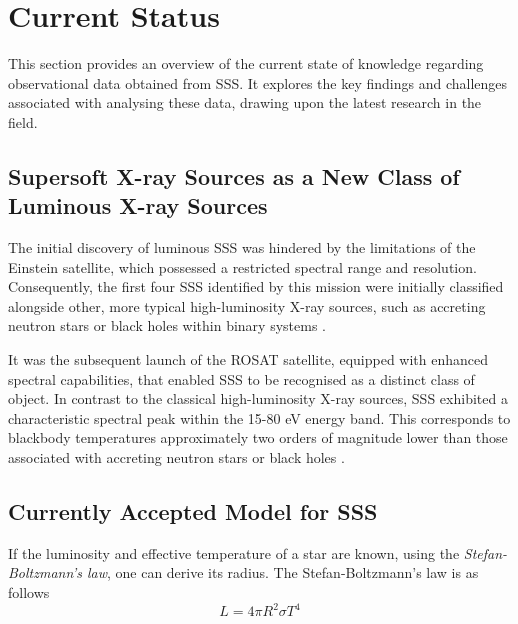    \section{Current Status} \label{introduction:current_status}
		This section provides an overview of the current state of knowledge regarding observational data obtained from SSS.  It explores the key findings and challenges associated with analysing these data, drawing upon the latest research in the field.
        
        \subsection{Supersoft X-ray Sources as a New Class of Luminous X-ray Sources} \label{introduction:current_status:new-class}
        	The initial discovery of luminous SSS was hindered by the limitations of the Einstein satellite, which possessed a restricted spectral range and resolution. Consequently, the first four SSS identified by this mission were initially classified alongside other, more typical high-luminosity X-ray sources, such as accreting neutron stars or black holes within binary systems \cite{long81,seward81}.
        	
        	It was the subsequent launch of the ROSAT satellite, equipped with enhanced spectral capabilities, that enabled SSS to be recognised as a distinct class of object. In contrast to the classical high-luminosity X-ray sources, SSS exhibited a characteristic spectral peak within the 15-80 eV energy band. This corresponds to blackbody temperatures approximately two orders of magnitude lower than those associated with accreting neutron stars or black holes \cite{kahabka97}.
        	
        \subsection{Currently Accepted Model for SSS} \label{introduction:current_status:SSS-model}
        	If the luminosity and effective temperature of a star are known, using the \emph{Stefan-Boltzmann's law}, one can derive its radius. The Stefan-Boltzmann's law is as follows
        	\begin{equation} \label{SSS-model:stef-boltz}
        		L=4\pi R^2\sigma T^4
        	\end{equation}
        	
